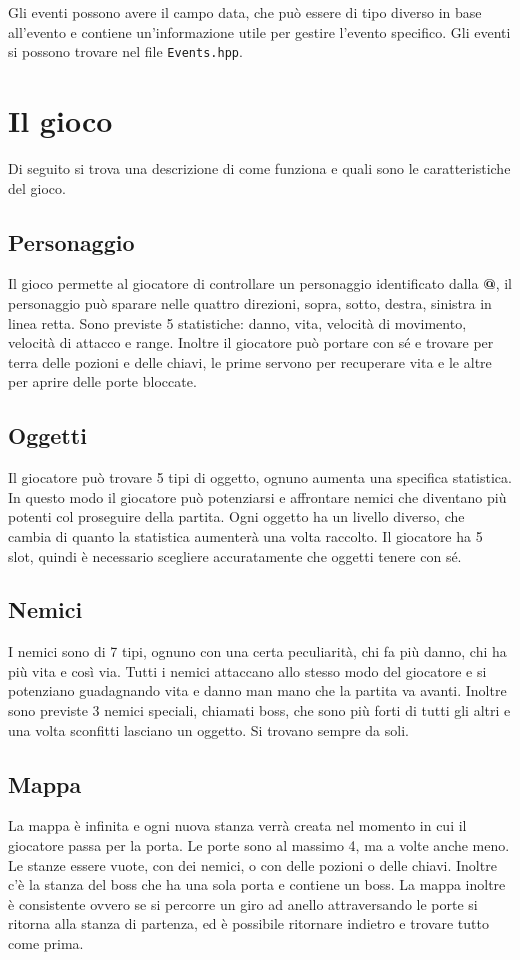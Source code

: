 \documentclass{article}
\begin{document}
Gli eventi possono avere il campo data, che può essere di tipo diverso in base all'evento e contiene un'informazione utile per gestire l'evento specifico.
Gli eventi si possono trovare nel file \texttt{Events.hpp}.

\section{Il gioco}
Di seguito si trova una descrizione di come funziona e quali sono le caratteristiche del gioco.

\subsection{Personaggio}
Il gioco permette al giocatore di controllare un personaggio identificato dalla \textbf{@}, il personaggio può sparare nelle quattro direzioni, sopra, sotto, destra, sinistra in linea retta.
Sono previste 5 statistiche: danno, vita, velocità di movimento, velocità di attacco e range. 
Inoltre il giocatore può portare con sé e trovare per terra delle pozioni e delle chiavi, le prime servono per recuperare vita e le altre per aprire delle porte bloccate.

\subsection{Oggetti}
Il giocatore può trovare 5 tipi di oggetto, ognuno aumenta una specifica statistica. In questo modo il giocatore può potenziarsi e affrontare nemici che diventano più potenti col proseguire della partita. Ogni oggetto ha un livello diverso, che cambia di quanto la statistica aumenterà una volta raccolto. Il giocatore ha 5 slot, quindi è necessario scegliere accuratamente che oggetti tenere con sé.

\subsection{Nemici}
I nemici sono di 7 tipi, ognuno con una certa peculiarità, chi fa più danno, chi ha più vita e così via. Tutti i nemici attaccano allo stesso modo del giocatore e si potenziano guadagnando vita e danno man mano che la partita va avanti.
Inoltre sono previste 3 nemici speciali, chiamati boss, che sono più forti di tutti gli altri e una volta sconfitti lasciano un oggetto. Si trovano sempre da soli.

\subsection{Mappa}
La mappa è infinita e ogni nuova stanza verrà creata nel momento in cui il giocatore passa per la porta. Le porte sono al massimo 4, ma a volte anche meno.
Le stanze essere vuote, con dei nemici, o con delle pozioni o delle chiavi. Inoltre c'è la stanza del boss che ha una sola porta e contiene un boss.
La mappa inoltre è consistente ovvero se si percorre un giro ad anello attraversando le porte si ritorna alla stanza di partenza, ed è possibile ritornare indietro e trovare tutto come prima.
\end{document}
